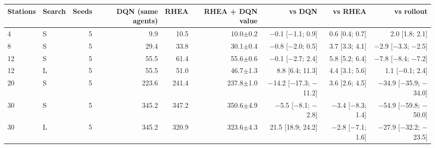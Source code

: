 \begin{tabular}{llrrrrrrr}
\toprule
Stations & Search & Seeds & DQN (same agents) & RHEA & RHEA + DQN value & vs DQN & vs RHEA & vs rollout \\
\midrule
4 & S & 5 & 9.9 & 10.5 & 10.0$\pm$0.2 & $-$0.1 [$-$1.1; 0.9] & 0.6 [0.4; 0.7] & 2.0 [1.8; 2.1] \\
8 & S & 5 & 29.4 & 33.8 & 30.1$\pm$0.4 & $-$0.8 [$-$2.0; 0.5] & 3.7 [3.3; 4.1] & $-$2.9 [$-$3.3; $-$2.5] \\
12 & S & 5 & 55.5 & 61.4 & 55.6$\pm$0.6 & $-$0.1 [$-$2.7; 2.4] & 5.8 [5.2; 6.4] & $-$7.8 [$-$8.4; $-$7.2] \\
12 & L & 5 & 55.5 & 51.0 & 46.7$\pm$1.3 & 8.8 [6.4; 11.3] & 4.4 [3.1; 5.6] & 1.1 [$-$0.1; 2.4] \\
20 & S & 5 & 223.6 & 241.4 & 237.8$\pm$1.0 & $-$14.2 [$-$17.3; $-$11.2] & 3.6 [2.6; 4.5] & $-$34.9 [$-$35.9; $-$34.0] \\
30 & S & 5 & 345.2 & 347.2 & 350.6$\pm$4.9 & $-$5.5 [$-$8.1; $-$2.8] & $-$3.4 [$-$8.3; 1.4] & $-$54.9 [$-$59.8; $-$50.0] \\
30 & L & 5 & 345.2 & 320.9 & 323.6$\pm$4.3 & 21.5 [18.9; 24.2] & $-$2.8 [$-$7.1; 1.6] & $-$27.9 [$-$32.2; $-$23.5] \\
\bottomrule
\end{tabular}
